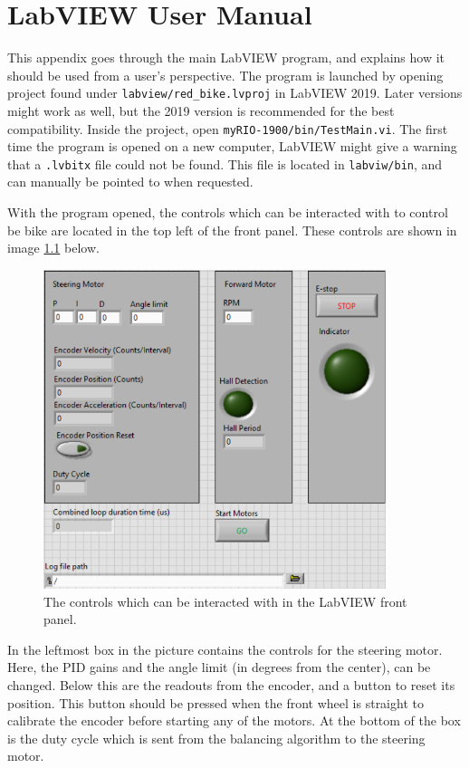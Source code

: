 \chapter{LabVIEW User Manual} \label{labviewManaul}

This appendix goes through the main LabVIEW program, and explains how it should be used from a user's perspective. The program is launched by opening project found under \texttt{labview/red\_bike.lvproj} in LabVIEW 2019. Later versions might work as well, but the 2019 version is recommended for the best compatibility. Inside the project, open \texttt{myRIO-1900/bin/TestMain.vi}. The first time the program is opened on a new computer, LabVIEW might give a warning that a \texttt{.lvbitx} file could not be found. This file is located in \texttt{labviw/bin}, and can manually be pointed to when requested.

With the program opened, the controls which can be interacted with to control be bike are located in the top left of the front panel. These controls are shown in image \ref{fig:labviewControls} below.

\begin{figure}[H]
    \centering
    \includegraphics[width=10cm]{figure/labview_controls.png}
    \caption{The controls which can be interacted with in the LabVIEW front panel.}
    \label{fig:labviewControls}
\end{figure}

In the leftmost box in the picture contains the controls for the steering motor. Here, the PID gains and the angle limit (in degrees from the center), can be changed. Below this are the readouts from the encoder, and a button to reset its position. This button should be pressed when the front wheel is straight to calibrate the encoder before starting any of the motors. At the bottom of the box is the duty cycle which is sent from the balancing algorithm to the steering motor.

